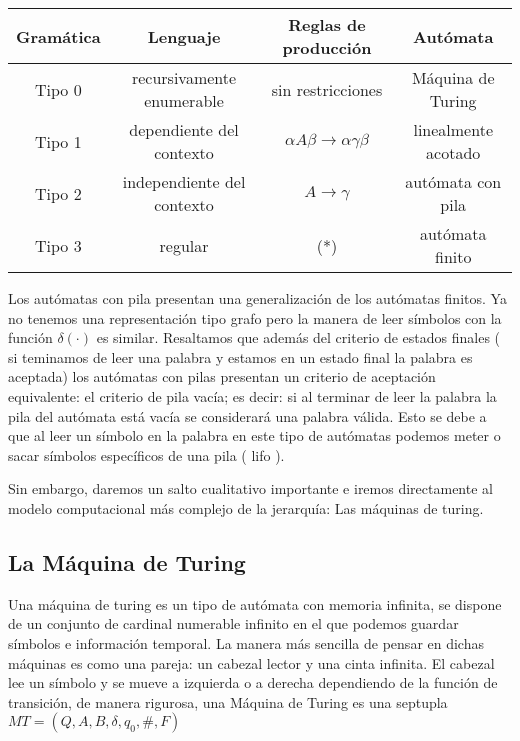 \begin{center}
	\begin{tabular}{|c|c|c|c|}
		\hline 
		Gramática & Lenguaje  &Reglas de producción   & Autómata  \\ 
		\hline 
		Tipo 0	& recursivamente enumerable  & sin restricciones  & Máquina de Turing  \\ 
		\hline 
		Tipo 1	& dependiente del contexto  & $\alpha A \beta \rightarrow \alpha \gamma \beta$ & linealmente acotado  \\ 
		\hline 
		Tipo 2	& independiente del contexto  & $A \rightarrow \gamma $  & autómata con pila   \\ 
		\hline 
		Tipo 3	& regular  & (*) & autómata finito \\
		\hline 
	\end{tabular} 
\end{center}

\vspace{1cm}

Los autómatas con pila presentan una generalización de los autómatas finitos. Ya no tenemos una representación tipo grafo pero la manera de leer símbolos con la función $\delta(\cdot)$ es similar. Resaltamos que además del criterio de estados finales ( si teminamos de leer una palabra y estamos en un estado final la palabra es aceptada) los autómatas con pilas presentan un criterio de aceptación equivalente: el criterio de pila vacía; es decir: si al terminar de leer la palabra la pila del autómata está vacía se considerará una palabra válida. Esto se debe a que al leer un símbolo en la palabra en este tipo de autómatas podemos meter o sacar símbolos específicos de una pila ( lifo ).

Sin embargo, daremos un salto cualitativo importante e iremos directamente al modelo computacional más complejo de la jerarquía: Las máquinas de turing.



\subsection{La Máquina de Turing}

 Una máquina de turing es un tipo de autómata con memoria infinita, se dispone de un conjunto de cardinal numerable infinito en el que podemos guardar símbolos e información temporal. La manera más sencilla de pensar en dichas máquinas es como una pareja: un cabezal lector y una cinta infinita. El cabezal lee un símbolo y se mueve a izquierda o a derecha dependiendo de la función de transición, de manera rigurosa, una Máquina de Turing es una septupla $MT=(Q,A,B,\delta,q_0,\#,F)$


